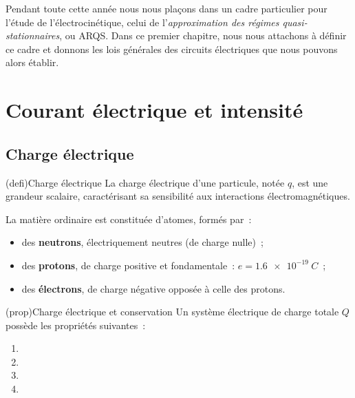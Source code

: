 \documentclass[../../main/main.tex]{subfiles}
\begin{document}
\vspace*{\fill}

Pendant toute cette année nous nous plaçons dans un cadre particulier pour
l'étude de l'électrocinétique, celui de l'\textit{approximation des régimes
	quasi-stationnaires}, ou ARQS. Dans ce premier chapitre, nous nous attachons à
définir ce cadre et donnons les lois générales des circuits électriques que nous
pouvons alors établir.

\vspace*{\fill}

\newpage

\section{Courant électrique et intensité}
\subsection{Charge électrique}

\begin{tcb*}[label=def:q, sidebyside](defi){Charge électrique}
	La charge électrique d'une particule, notée $q$, est une grandeur
	scalaire, caractérisant sa sensibilité aux interactions
	électromagnétiques.
	\tcblower
\end{tcb*}
La matière ordinaire est constituée d'atomes, formés par~:
\begin{itemize}
	\item
	      des \textbf{neutrons}, électriquement neutres (de charge nulle)~;
	\item
	      des \textbf{protons}, de charge positive et fondamentale~: $e =
		      \SI{1.6e-19}{C}$~;
	\item
	      des \textbf{électrons}, de charge négative opposée à celle des
	      protons.
\end{itemize}
\begin{tcb*}[label=prop:q](prop){Charge électrique et conservation}
	Un système électrique de charge totale $Q$ possède les propriétés
	suivantes~:
	\begin{enumerate}
		\item {}%
		\item {}%
		\item {}%
		\item {}%
	\end{enumerate}
\end{tcb*}
\end{document}
